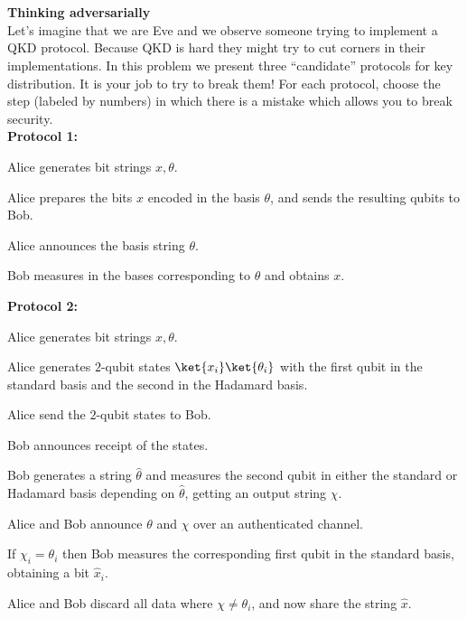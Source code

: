\chapter{}


\begin{exercises}

%
%
\item {\bf Thinking adversarially}\\
Let's imagine that we are Eve and we observe someone trying to implement a QKD protocol. Because QKD is hard they might try to cut corners in their implementations. In this problem we present three ``candidate'' protocols for key distribution. It is your job to try to break them! For each protocol, choose the step (labeled by numbers) in which there is a mistake which allows you to break security.  \\
{\bf Protocol 1:}
\begin{protocolEnumerate}
\item Alice generates bit strings $x, \theta$.
\item Alice prepares the bits $x$ encoded in the basis $\theta$, and sends the resulting qubits to Bob. 
\item Alice announces the basis string $\theta$.
\item Bob measures in the bases corresponding to $\theta$ and obtains $x$.
\end{protocolEnumerate}
{\bf Protocol 2:}
\begin{protocolEnumerate}
\item Alice generates bit strings $x, \theta$.
\item Alice generates $2$-qubit states $\ket{x_i}\ket{\theta_i}$ with the first qubit in the standard basis and the second in the Hadamard basis.
\item Alice send the $2$-qubit states to Bob.
\item Bob announces receipt of the states.
\item Bob generates a string $\hat{\theta}$ and measures the second qubit in either the standard or Hadamard basis depending on $\hat{\theta}$, getting an output string $\chi$.
\item Alice and Bob announce $\theta$ and $\chi$ over an authenticated channel.
\item If $\chi_i=\theta_i$ then Bob measures the corresponding first qubit in the standard basis, obtaining a bit $\hat{x}_i$.
\item Alice and Bob discard all data where $\chi\neq\theta_i$, and now share the string $\hat{x}$.

\end{protocolEnumerate}
\end{exercises}
